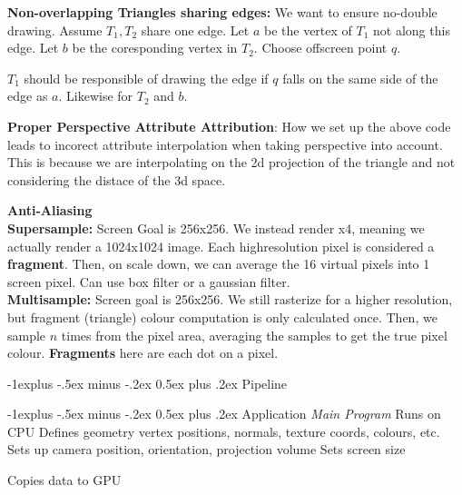 \documentclass[letterpaper, 8pt]{extarticle}
\makeatletter
\renewcommand{\section}{\@startsection{section}{1}{0mm}%
                                {-1explus -.5ex minus -.2ex}%
                                {0.5ex plus .2ex}%
                                {\normalfont\small\bfseries}}
\renewcommand{\subsection}{\@startsection{subsection}{2}{0mm}%
                                {-1explus -.5ex minus -.2ex}%
                                {0.5ex plus .2ex}%
                                {\normalfont\tiny\bfseries}}
\makeatother
\begin{document}
\begin{multicols*}{4}
\textbf{Non-overlapping Triangles sharing edges:} We want to ensure no-double drawing.
Assume $T_1, T_2$ share one edge. Let $a$ be the vertex of $T_1$ not along this edge. Let $b$ be the coresponding vertex in $T_2$.
Choose offscreen point $q$.

$T_1$ should be responsible of drawing the edge if $q$ falls on the same side of the edge as $a$. Likewise for $T_2$ and $b$.


\textbf{Proper Perspective Attribute Attribution}: How we set up the above code leads to incorect attribute interpolation when taking perspective into account.
This is because we are interpolating on the 2d projection of the triangle and not considering the distace of the 3d space.



\textbf{Anti-Aliasing}\\
\textbf{Supersample: }Screen Goal is 256x256. We instead render x4, meaning we actually render a 1024x1024 image. Each highresolution pixel is considered a \textbf{fragment}.
Then, on scale down, we can average the 16 virtual pixels into 1 screen pixel.
Can use box filter or a gaussian filter.\\
\textbf{Multisample: }
Screen goal is 256x256. We still rasterize for a higher resolution, but fragment (triangle) colour computation is only calculated once.
Then, we sample $n$ times from the pixel area, averaging the samples to get the true pixel colour.
\textbf{Fragments} here are each dot on a pixel.

\section{Pipeline}

\subsection{Application}
\textit{Main Program}
Runs on CPU
Defines geometry vertex positions, normals, texture coords, colours, etc.
Sets up camera position, orientation, projection volume
Sets screen size

Copies data to GPU


\end{multicols*}
\end{document}
